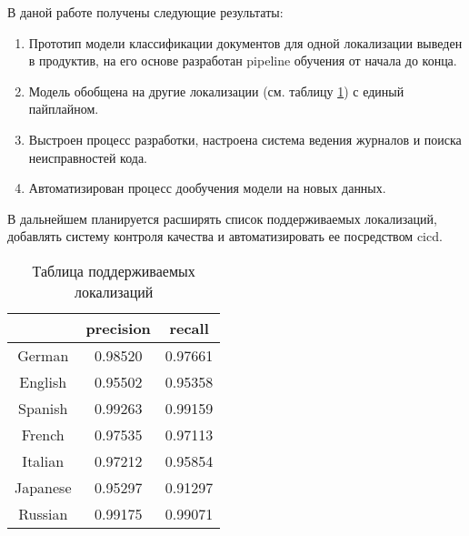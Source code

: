 
\conclusion

В даной работе получены следующие результаты:

\begin{enumerate}
    \item Прототип модели классификации документов для одной локализации выведен в продуктив, на его основе разработан \gls{pipeline} обучения от начала до конца.
    \item Модель обобщена на другие локализации (см. таблицу \ref{table:supported_locales}) с единый пайплайном.
    \item Выстроен процесс разработки, настроена система ведения журналов и поиска неисправностей кода.
    \item Автоматизирован процесс дообучения модели на новых данных.
\end{enumerate}

В дальнейшем планируется расширять список поддерживаемых локализаций, добавлять систему контроля качества и автоматизировать ее посредством \gls{cicd}.

\begin{table}[h]
    \centering
    \begin{tabular}{|c|c|c|}
        \hline
                 & precision & recall  \\ \hline
        German   & 0.98520   & 0.97661 \\ \hline
        English  & 0.95502   & 0.95358 \\ \hline
        Spanish  & 0.99263   & 0.99159 \\ \hline
        French   & 0.97535   & 0.97113 \\ \hline
        Italian  & 0.97212   & 0.95854 \\ \hline
        Japanese & 0.95297   & 0.91297 \\ \hline
        Russian  & 0.99175   & 0.99071 \\ \hline
    \end{tabular}
    \caption{Таблица поддерживаемых локализаций}
    \label{table:supported_locales}
\end{table}
